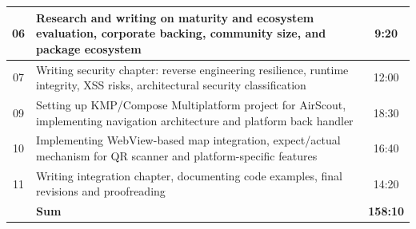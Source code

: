 \begin{table}[H]
\begin{tabularx}{\textwidth}{|c|X|c|}
        \hline %
        06            & Research and writing on maturity and ecosystem evaluation, corporate backing, community size, and package ecosystem                                     & 9:20            \\
        \hline %
        07            & Writing security chapter: reverse engineering resilience, runtime integrity, XSS risks, architectural security classification                           & 12:00           \\
        \hline %
        09            & Setting up KMP/Compose Multiplatform project for AirScout, implementing navigation architecture and platform back handler                               & 18:30           \\
        \hline %
        10            & Implementing WebView-based map integration, expect/actual mechanism for QR scanner and platform-specific features                                       & 16:40           \\
        \hline %
        11            & Writing integration chapter, documenting code examples, final revisions and proofreading                                                               & 14:20           \\
        \hline %
                      & \textbf{Sum}                                                                                                                                            & \textbf{158:10} \\
        \hline %
    \end{tabularx}
\end{table}